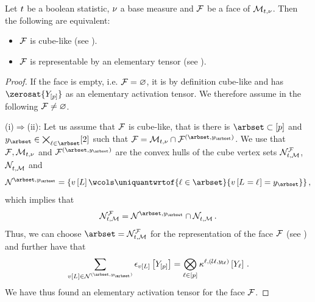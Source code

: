 \begin{theorem}
    \label{the:faceMeasureHardLogicNetworks}
    Let $t$ be a boolean statistic, $\nu$ a base measure and $\mathcal{F}$ be a face of $\mathcal{M}_{t,\nu}$.
    Then the following are equivalent:
    \begin{itemize}
        \item[(i)] $\mathcal{F}$ is cube-like (see ).
        \item[(ii)] $\mathcal{F}$ is representable by an elementary tensor (see ).
    \end{itemize}
\end{theorem}
\begin{proof}
    If the face is empty, i.e. $\mathcal{F}=\varnothing$, it is by definition cube-like and has $\zerosat{\headvariables}$ as an elementary activation tensor.
    We therefore assume in the following $\mathcal{F}\neq\varnothing$.

    (i)$\Rightarrow$(ii):
    Let us assume that $\mathcal{F}$ is cube-like, that is there is $\arbset\subset[\seldim]$ and $\headindexof{\arbset}\in\bigtimes_{\selindex\in\arbset}[2]$ such that $\facesymbol = \genmeanset \cap \facesymbolof{(\arbset,\headindexof{\arbset})}$.
    We use that $\mathcal{F},\mathcal{M}_{t,\nu}$ and $\facesymbolof{(\arbset,\headindexof{\arbset})}$ are the convex hulls of the cube vertex sets $\mathcal{N}_{t,\mathcal{M}}^{\mathcal{F}}$, $\mathcal{N}_{t,\mathcal{M}}^{}$ and
    \begin{align}\label{eq:cubeFaceVertices}
        \imsetof{}{\arbset,\headindexof{\arbset}}
        = \{\imelementwith \wcols \uniquantwrtof{\selindex\in\arbset}{\imelementat{\indexedselvariable}=\headindexof{\arbset}}\} \, ,
    \end{align}
    which implies that
    \begin{align*}
        \imsetof{\hlnstat,\meanset}{\facesymbol}
        = \imsetof{}{\arbset,\headindexof{\arbset}} \cap \imsetof{\hlnstat,\meanset}{} \, .
    \end{align*}
    Thus, we can choose $\arbset=\imsetof{\hlnstat,\meanset}{\facesymbol}$ for the representation of the face $\mathcal{F}$ (see ) and further have that
    \begin{align*}
        \sum_{\imelementwith\in\imsetof{}{(\arbset,\headindexof{\arbset})}}\onehotmapofat{\imelementwith}{\headvariables}
        = \bigotimes_{\selindexin} \hardactlegwith \, .
    \end{align*}
    We have thus found an elementary activation tensor for the face $\mathcal{F}$.


\end{proof}
